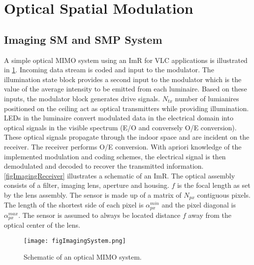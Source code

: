 \section{Optical Spatial Modulation}
\label{sec:osm}

\graphicspath{{_MIMOSpace/figures_osm/}}

\subsection{Imaging SM and SMP System}
\label{subsec:osmSystem}
A simple optical MIMO system using an ImR for VLC applications is illustrated in \figurename{ \ref{figImagingSystem}}. Incoming data stream is coded and input to the modulator. The illumination state block provides a second input to the modulator which is the value of the average intensity to be emitted from each luminaire. Based on these inputs, the modulator block generates drive signals. $N_{tx}$ number of lumianires positioned on the ceiling act as optical transmitters while providing illumination. LEDs in the luminaire convert modulated data in the electrical domain into optical signals in the visible spectrum (E/O and conversely O/E conversion). These optical signals propagate through the indoor space and are incident on the receiver. The receiver performs O/E conversion. With apriori knowledge of the implemented modulation and coding schemes, the electrical signal is then demodulated and decoded to recover the transmitted information. \figurename{ \ref{figImagingReceiver}} illustrates a schematic of an ImR. The optical assembly consists of a filter, imaging lens, aperture and housing. $f$ is the focal length as set by the lens assembly. The sensor is made up of a matrix of $N_{px}$ contiguous pixels. The length of the shortest side of each pixel is $\alpha_{px}^{min}$ and the pixel diagonal is $\alpha_{px}^{max}$. The sensor is assumed to always be located distance $f$ away from the optical center of the lens.

\begin{figure}[!b]
	\centering
		\texttt{[image: figImagingSystem.png]}
	\caption{Schematic of an optical MIMO system.}
	\label{figImagingSystem}
\end{figure}

